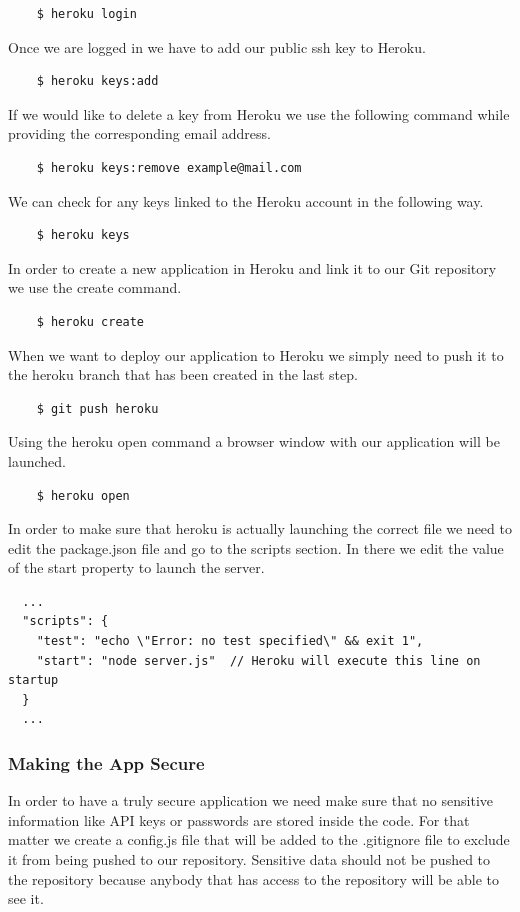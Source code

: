 \begin{verbatim}
	$ heroku login
\end{verbatim}

Once we are logged in we have to add our public ssh key to Heroku.

\begin{verbatim}
	$ heroku keys:add
\end{verbatim}

If we would like to delete a key from Heroku we use the following command while providing the corresponding email address. 
\begin{verbatim}
	$ heroku keys:remove example@mail.com 
\end{verbatim}

We can check for any keys linked to the Heroku account in the following way.
\begin{verbatim}
	$ heroku keys 
\end{verbatim}

In order to create a new application in Heroku and link it to our Git repository we use the create command. 
\begin{verbatim}
	$ heroku create
\end{verbatim}

When we want to deploy our application to Heroku we simply need to push it to the heroku branch that has been created in the last step. 
\begin{verbatim}
	$ git push heroku
\end{verbatim}

Using the heroku open command a browser window with our application will be launched.
\begin{verbatim}
	$ heroku open
\end{verbatim}

In order to make sure that heroku is actually launching the correct file we need to edit the package.json file and go to the scripts section. In there we edit the value of the start property to launch the server. 

\begin{lstlisting}
  ...
  "scripts": {
    "test": "echo \"Error: no test specified\" && exit 1",
    "start": "node server.js"  // Heroku will execute this line on startup 
  } 
  ...
\end{lstlisting}


\subsubsection{Making the App Secure}
In order to have a truly secure application we need make sure that no sensitive information like API keys or passwords are stored inside the code. For that matter we create a config.js file that will be added to the .gitignore file to exclude it from being pushed to our repository. Sensitive data should not be pushed to the repository because anybody that has access to the repository will be able to see it.   
 

